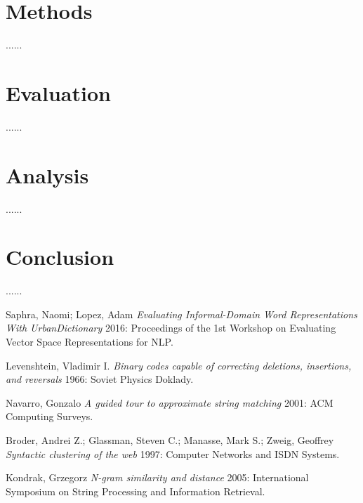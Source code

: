 \documentclass[12pt]{article}
\begin{document}
\section{Methods}
......

\section{Evaluation}
......

\section{Analysis}
......

\section{Conclusion}
......


\begin{thebibliography}{99}

 Saphra, Naomi; Lopez, Adam {\em Evaluating Informal-Domain Word Representations With UrbanDictionary} 2016: Proceedings of the 1st Workshop on Evaluating Vector Space Representations for NLP.

 Levenshtein, Vladimir I. {\em Binary codes capable of correcting deletions, insertions, and reversals} 1966: Soviet Physics Doklady.

 Navarro, Gonzalo {\em A guided tour to approximate string matching} 2001: ACM Computing Surveys.

 Broder, Andrei Z.; Glassman, Steven C.; Manasse, Mark S.; Zweig, Geoffrey {\em Syntactic clustering of the web} 1997: Computer Networks and ISDN Systems.

 Kondrak, Grzegorz {\em N-gram similarity and distance} 2005: International Symposium on String Processing and Information Retrieval.

\end{thebibliography}
  
\end{document}
